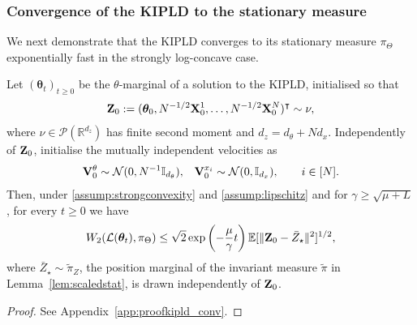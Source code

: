 \subsubsection{Convergence of the KIPLD to the stationary measure} \label{sec:numerical}
We next demonstrate that the KIPLD converges to its stationary measure $\pi_\Theta$ exponentially fast in the strongly log-concave case.

\begin{proposition}\label{prop:kipld_conv}
Let $(\bm{\theta}_t)_{t\geq 0}$ be the $\theta$-marginal of a solution to the KIPLD, initialised so that
\begin{align*}
{\mathbf Z}_0
:=(\bm\theta_0,N^{-1/2}{\mathbf X}_0^1,\ldots,N^{-1/2}{\mathbf X}_0^N)^\intercal
\sim\nu,
\end{align*}
where $\nu\in\mathcal P(\mathbb R^{d_z})$ has finite second moment and $d_z=d_\theta+Nd_x$.  Independently of ${\mathbf Z}_0$, initialise the mutually independent velocities as
\begin{align*}
{\mathbf V}_0^\theta&\sim\mathcal N(0,N^{-1}\mathbb I_{d_\theta}),&
{\mathbf V}_0^{x_i}\sim\mathcal N(0,\mathbb I_{d_x}),\qquad i\in[N].
\end{align*}
Then, under \ref{assump:strongconvexity} and \ref{assump:lipschitz} and for $\gamma \geq \sqrt{\mu + L}$, for every $t\geq0$ we have
\begin{align*}
W_2(\mathcal{L}(\bm{\theta}_t), \pi_\Theta) \leq \sqrt{2} \exp\left(-\frac{\mu}{\gamma}t\right) \mathbb{E}[\|{\mathbf Z}_0 - \bar{Z}_\star\|^2]^{1/2},
\end{align*}
where $\bar{Z}_\star\sim\widetilde\pi_Z$, the position marginal of the invariant measure $\widetilde\pi$ in Lemma~\ref{lem:scaledstat}, is drawn independently of ${\mathbf Z}_0$.
\end{proposition}
\begin{proof} See Appendix~\ref{app:proofkipld_conv}. \end{proof}

